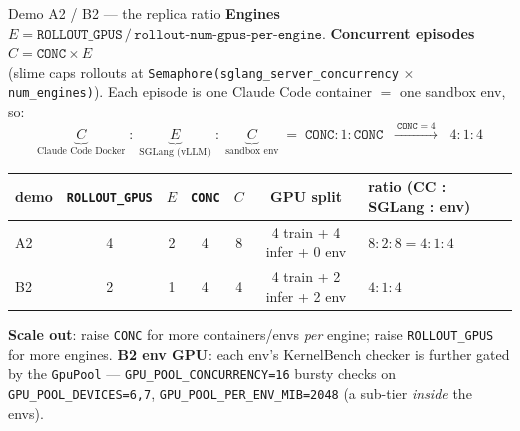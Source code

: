 \documentclass[aspectratio=169]{beamer}
\begin{document}
\begin{frame}{Demo A2 / B2 --- the replica ratio}
  \footnotesize
  \textbf{Engines} $E = \texttt{ROLLOUT\_GPUS} \,/\, \texttt{rollout-num-gpus-per-engine}$.\quad
  \textbf{Concurrent episodes} $C = \texttt{CONC} \times E$ \\
  (slime caps rollouts at \texttt{Semaphore(sglang\_server\_concurrency} $\times$ \texttt{num\_engines)}).
  Each episode is one Claude Code container $=$ one sandbox env, so:
  \[ \underbrace{C}_{\text{Claude Code Docker}} \;:\; \underbrace{E}_{\text{SGLang (vLLM)}} \;:\;
     \underbrace{C}_{\text{sandbox env}} \;=\; \texttt{CONC} : 1 : \texttt{CONC}
     \;\;\xrightarrow{\ \texttt{CONC}=4\ }\;\; 4 : 1 : 4 \]
  \vspace{-0.2em}
  \begin{center}
  \renewcommand{\arraystretch}{1.2}\scriptsize
  \begin{tabular}{lcccccl}
    \toprule
    demo & \texttt{ROLLOUT\_GPUS} & $E$ & \texttt{CONC} & $C$ & GPU split & ratio (CC : SGLang : env) \\
    \midrule
    A2 & 4 & 2 & 4 & 8 & 4 train + 4 infer + 0 env & $8:2:8 = 4:1:4$ \\
    B2 & 2 & 1 & 4 & 4 & 4 train + 2 infer + 2 env & $4:1:4$ \\
    \bottomrule
  \end{tabular}
  \end{center}
  \vspace{0.1em}
  {\scriptsize \textbf{Scale out}: raise \texttt{CONC} for more containers/envs \emph{per} engine; raise
  \texttt{ROLLOUT\_GPUS} for more engines. \textbf{B2 env GPU}: each env's KernelBench checker is
  further gated by the \texttt{GpuPool} --- \texttt{GPU\_POOL\_CONCURRENCY=16} bursty checks on
  \texttt{GPU\_POOL\_DEVICES=6,7}, \texttt{GPU\_POOL\_PER\_ENV\_MIB=2048} (a sub-tier \emph{inside} the envs).}
\end{frame}
\end{document}
